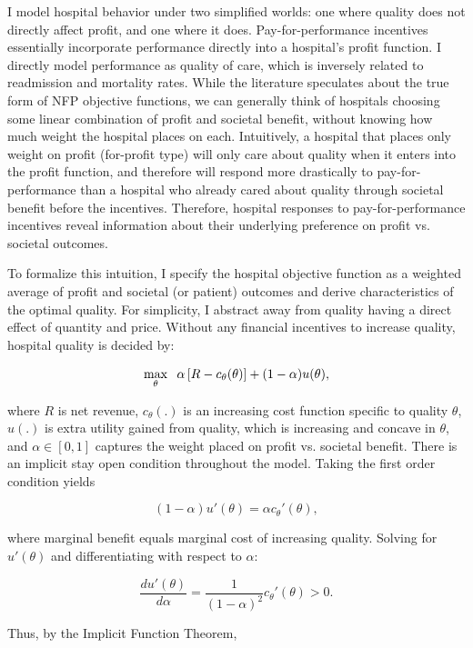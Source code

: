 \documentclass[12pt]{article}
\begin{document}
    I model hospital behavior under two simplified worlds: one where quality does not directly affect profit, and one where it does. Pay-for-performance incentives essentially incorporate performance directly into a hospital's profit function. I directly model performance as quality of care, which is inversely related to readmission and mortality rates. While the literature speculates about the true form of NFP objective functions, we can generally think of hospitals choosing some linear combination of profit and societal benefit, without knowing how much weight the hospital places on each. Intuitively, a hospital that places only weight on profit (for-profit type) will only care about quality when it enters into the profit function, and therefore will respond more drastically to pay-for-performance than a hospital who already cared about quality through societal benefit before the incentives. Therefore, hospital responses to pay-for-performance incentives reveal information about their underlying preference on profit vs. societal outcomes. 

    To formalize this intuition, I specify the hospital objective function as a weighted average of profit and societal (or patient) outcomes and derive characteristics of the optimal quality. For simplicity, I abstract away from quality having a direct effect of quantity and price. Without any financial incentives to increase quality, hospital quality is decided by:  
    
    $$\max_{\theta}\hspace{2mm}\alpha\left[R - c_{\theta}(\theta) \right] + (1-\alpha) u(\theta),$$

    \noindent where $R$ is net revenue, $c_{\theta}(.)$ is an increasing cost function specific to quality $\theta$, $u(.)$ is extra utility gained from quality, which is increasing and concave in $\theta$, and $\alpha\in[0,1]$ captures the weight placed on profit vs. societal benefit. There is an implicit stay open condition throughout the model. Taking the first order condition yields 

    $$(1-\alpha)u'(\theta) = \alpha c_{\theta}'(\theta),$$

    \noindent where marginal benefit equals marginal cost of increasing quality. Solving for $u'(\theta)$ and differentiating with respect to $\alpha$:

    $$\frac{du'(\theta)}{d\alpha} = \frac{1}{(1-\alpha)^2}c_{\theta}'(\theta) > 0.$$

    \noindent Thus, by the Implicit Function Theorem, 
\end{document}
